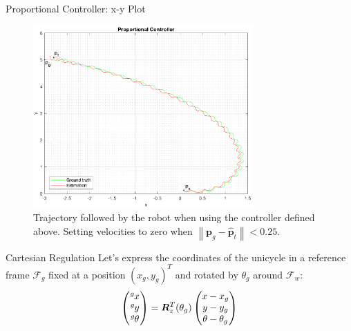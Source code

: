 \documentclass[10pt]{beamer}
\begin{document}
    \begin{frame}{Proportional Controller: x-y Plot}
        \begin{figure}
            \caption{Trajectory followed by the robot when using the controller
                defined above. Setting velocities to zero when
                $\left\|\bm{p}_g - \bm{\hat{p}}_t \right\| < 0.25$.}
            \vspace{-0.3cm}
            \includegraphics[width=0.75\textwidth]{images/proportional_controller.png}
        \end{figure}
    \end{frame}

    \begin{frame}{Cartesian Regulation}
        \justifying
        Let's express the coordinates of the unicycle in a reference frame
        $\mathcal{F}_g$ fixed at a position $(x_g, y_g)^T$ and
        rotated by $\theta_g$ around $\mathcal{F}_w$:
        \begin{equation*}
            \begin{pmatrix}
                \tensor[^g]{x}{} \\
                \tensor[^g]{y}{} \\
                \tensor[^g]{\theta}{}
            \end{pmatrix}
                =
            \bm{R}_z^T(\theta_g)
            \begin{pmatrix}
                x - x_g \\
                y - y_g \\
                \theta - \theta_g
            \end{pmatrix}
        \end{equation*}
    \end{frame}
\end{document}

